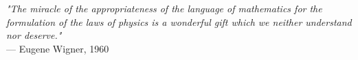 \begin{flushright}
\emph{"The miracle of the appropriateness of the language of mathematics for the formulation of the laws of physics is a wonderful gift which we neither understand nor deserve."}\\
— Eugene Wigner, 1960
\end{flushright}
